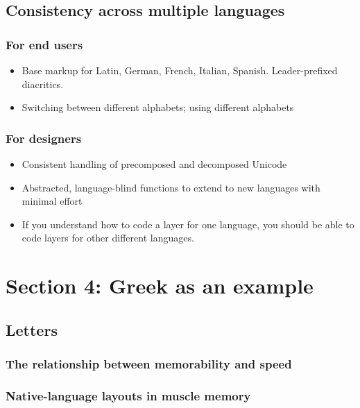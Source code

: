\documentclass[11pt]{article}
\begin{document}
\subsection{Consistency across multiple languages}
\label{sec:org08afcbd}

\subsubsection{For end users}
\label{sec:org9a99d16}

\begin{itemize}
\item Base markup for Latin, German, French, Italian, Spanish. Leader-prefixed diacritics.
\item Switching between different alphabets; using different alphabets
\end{itemize}

\subsubsection{For designers}
\label{sec:orgd10cf76}

\begin{itemize}
\item Consistent handling of precomposed and decomposed Unicode
\item Abstracted, language-blind functions to extend to new languages with minimal effort
\item If you understand how to code a layer for one language, you should be able to code layers for other different languages.
\end{itemize}

\section{Section 4: Greek as an example}
\label{sec:org275f2f7}

\subsection{Letters}
\label{sec:org6f2f9a2}

\subsubsection{The relationship between memorability and speed}
\label{sec:orgd7b1fb7}

\subsubsection{Native-language layouts in muscle memory}
\label{sec:orgeadaa82}
\end{document}
